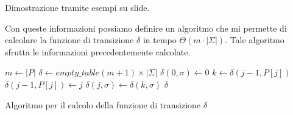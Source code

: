 \begin{nota}
    Dimostrazione tramite esempi su slide.
\end{nota}
Con queste informazioni possiamo definire un algoritmo che mi permette di calcolare
la funzione di transizione $\delta$ in tempo $\Theta(m \cdot |\Sigma|)$. Tale
algoritmo sfrutta le informazioni precedentemente calcolate.
\begin{algorithm}[!ht]
    \begin{algorithmic}
        \State $m \gets |P|$
        \State $\delta \gets empty\_table (m + 1) \times | \Sigma|$
        \For{$\sigma \in \Sigma$}
        \State $\delta(0, \sigma) \gets 0$
        \EndFor
        \State $k \gets \delta(j - 1, P[j])$
        \State $\delta(j - 1, P[j]) \gets j$
        \For{$\sigma \in \Sigma$}
        \State $\delta(j, \sigma) \gets \delta(k, \sigma)$
        \EndFor
        \EndFor
        \State \Return $\delta$
        \EndFunction
    \end{algorithmic}
    \caption{Algoritmo per il calcolo della funzione di transizione $\delta$}
\end{algorithm}
